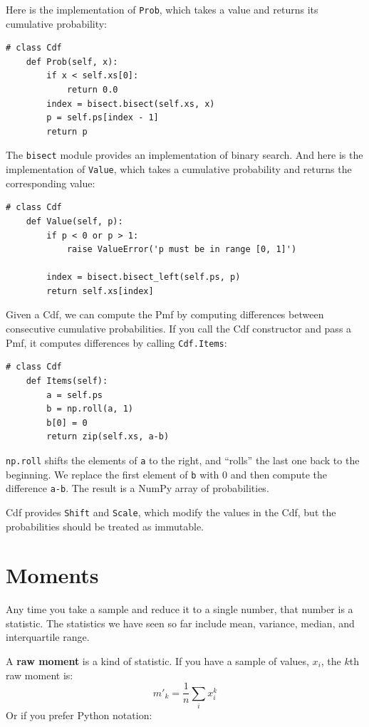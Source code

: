 Here is the implementation of {\tt Prob}, which takes a value
and returns its cumulative probability: 

\begin{verbatim}
# class Cdf
    def Prob(self, x):
        if x < self.xs[0]:
            return 0.0
        index = bisect.bisect(self.xs, x)
        p = self.ps[index - 1]
        return p
\end{verbatim}

The {\tt bisect} module provides an implementation of binary search.
And here is the implementation of {\tt Value}, which takes a
cumulative probability and returns the corresponding value:

\begin{verbatim}
# class Cdf
    def Value(self, p):
        if p < 0 or p > 1:
            raise ValueError('p must be in range [0, 1]')

        index = bisect.bisect_left(self.ps, p)
        return self.xs[index]
\end{verbatim}

Given a Cdf, we can compute the Pmf by computing differences between
consecutive cumulative probabilities.  If you call the Cdf constructor
and pass a Pmf, it computes differences by calling {\tt Cdf.Items}:

\begin{verbatim}
# class Cdf
    def Items(self):
        a = self.ps
        b = np.roll(a, 1)
        b[0] = 0
        return zip(self.xs, a-b)
\end{verbatim}

{\tt np.roll} shifts the elements of {\tt a} to the right, and ``rolls''
the last one back to the beginning.  We replace the first element of
{\tt b} with 0 and then compute the difference {\tt a-b}.  The result
is a NumPy array of probabilities.

Cdf provides {\tt Shift} and {\tt Scale}, which modify the
values in the Cdf, but the probabilities should be treated as
immutable.


\section{Moments}

Any time you take a sample and reduce it to a single number, that
number is a statistic.  The statistics we have seen so far include
mean, variance, median, and interquartile range.

A {\bf raw moment} is a kind of statistic.  If you have a sample of
values, $x_i$, the $k$th raw moment is:
%
\[ m'_k = \frac{1}{n} \sum_i x_i^k \]
%
Or if you prefer Python notation:

